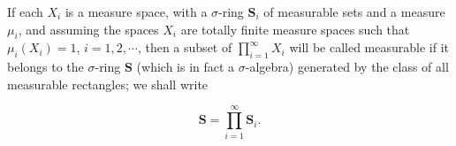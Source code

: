 If each $X_i$ is a measure space, with a $\sigma$-ring $\mathbf{S}_i$ of measurable sets and a measure $\mu_i$, and assuming the spaces $X_i$ are totally finite measure spaces such that $\mu_i(X_i) = 1$, $i = 1, 2, \cdots$, then a subset of $\prod_{i=1}^{\infty} X_i$ will be called measurable if it belongs to the $\sigma$-ring $\mathbf{S}$ (which is in fact a $\sigma$-algebra) generated by the class of all measurable rectangles; we shall write

$$\mathbf{S} = \prod_{i=1}^{\infty} \mathbf{S}_i.$$
